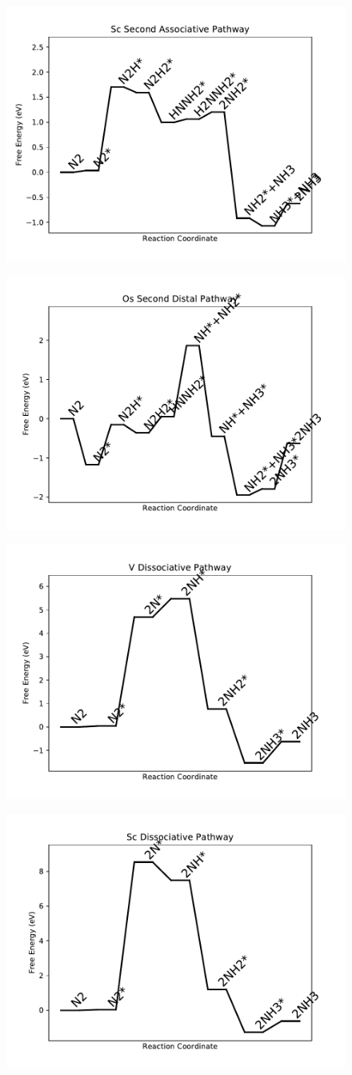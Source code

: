 \begin{figure}
\includegraphics[width=0.5\linewidth]{data/plots/Sc_associative_2.pdf}
\label{fig:Sc_associative_2}
\end{figure}

\begin{figure}
\includegraphics[width=0.5\linewidth]{data/plots/Os_distal_2.pdf}
\label{fig:Os_distal_2}
\end{figure}

\begin{figure}
\includegraphics[width=0.5\linewidth]{data/plots/V_dissociative.pdf}
\label{fig:V_dissociative}
\end{figure}

\begin{figure}
\includegraphics[width=0.5\linewidth]{data/plots/Sc_dissociative.pdf}
\label{fig:Sc_dissociative}
\end{figure}

